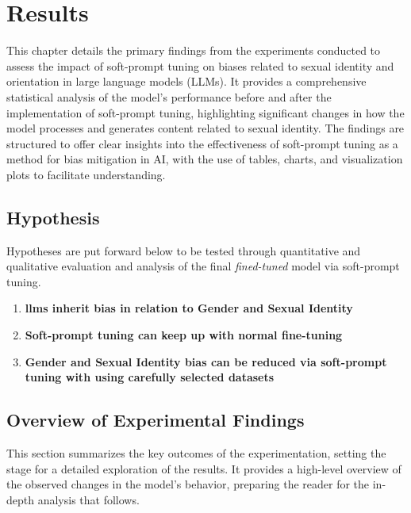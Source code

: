 \chapter{Results}

This chapter details the primary findings from the experiments conducted to assess the impact of soft-prompt tuning on biases related to sexual identity and orientation in large language models (LLMs). It provides a comprehensive statistical analysis of the model's performance before and after the implementation of soft-prompt tuning, highlighting significant changes in how the model processes and generates content related to sexual identity. The findings are structured to offer clear insights into the effectiveness of soft-prompt tuning as a method for bias mitigation in AI, with the use of tables, charts, and visualization plots to facilitate understanding.


\section{Hypothesis}
Hypotheses are put forward below to be tested through quantitative and qualitative evaluation and analysis of the final \textit{fined-tuned} model via soft-prompt tuning.

\renewcommand{\labelenumi}{\textbf{\Roman{enumi}.}}
\begin{enumerate}
\item \textbf{\acrshort{llms} inherit bias in relation to Gender and Sexual Identity}
\par \bigskip
\item \textbf{Soft-prompt tuning can keep up with normal fine-tuning}
\par \bigskip
\item \textbf{Gender and Sexual Identity bias can be reduced via soft-prompt tuning with using carefully selected datasets}
\par \bigskip

\end{enumerate}

\section{Overview of Experimental Findings}

This section summarizes the key outcomes of the experimentation, setting the stage for a detailed exploration of the results. It provides a high-level overview of the observed changes in the model's behavior, preparing the reader for the in-depth analysis that follows.

